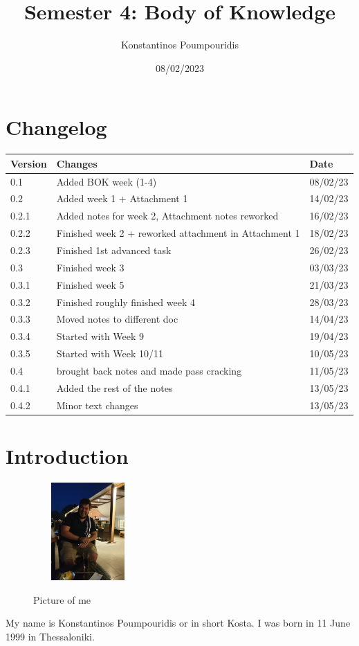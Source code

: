 \documentclass[12pt, letterpaper]{article}
\title{Semester 4: Body of Knowledge}
\author{Konstantinos Poumpouridis}
\date{08/02/2023}
\begin{document}
\maketitle
\thispagestyle{empty}
    
\newpage
\section{Changelog}
    \begin{table}[htbp]
        \begin{tabular}{|l|l|l|}
            \hline
            Version & Changes         & Date   \tabularnewline \hline
            0.1     & Added BOK week (1-4) & 08/02/23 \tabularnewline \hline
        0.2  &  Added week 1 + Attachment 1 & 14/02/23 \tabularnewline \hline
       0.2.1     &    Added notes for week 2, Attachment notes reworked     &  16/02/23      \tabularnewline \hline
       0.2.2  &  Finished week 2 + reworked attachment in Attachment 1 & 18/02/23 \tabularnewline \hline
       0.2.3  &  Finished 1st advanced task  & 26/02/23 \tabularnewline \hline
       0.3  &  Finished week 3  & 03/03/23 \tabularnewline \hline
        0.3.1  &  Finished week 5  & 21/03/23 \tabularnewline \hline
        0.3.2  &  Finished roughly finished week 4  & 28/03/23 \tabularnewline \hline
         0.3.3  & Moved notes to different doc  & 14/04/23 \tabularnewline \hline
         0.3.4  & Started with Week 9 & 19/04/23 \tabularnewline 
          0.3.5  & Started with Week 10/11 & 10/05/23 \tabularnewline
           0.4  & brought back notes and made pass cracking & 11/05/23 \tabularnewline
           0.4.1  & Added the rest of the notes & 13/05/23 \tabularnewline
           0.4.2  & Minor text changes & 13/05/23 \tabularnewline
        \end{tabular}
    \end{table}
\newpage
\tableofcontents
\newpage
\section{Introduction}
\begin{figure}
    \includegraphics[width=0.25\textwidth]{fotos/Kosta.jpeg}
    \caption{Picture of me}
\end{figure}
My name is Konstantinos Poumpouridis or in short Kosta. I was born in 11 June 1999 in Thessaloniki.
\end{document}

